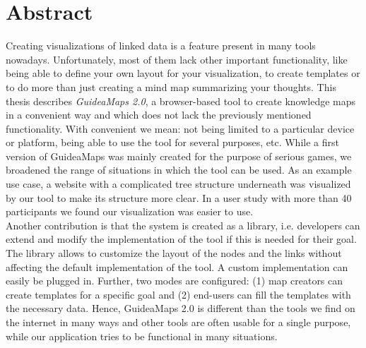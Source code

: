 \section*{Abstract}%

\color{blue}

Creating visualizations of linked data is a feature present in many tools nowadays. Unfortunately, most of them lack other important functionality, like being able to define your own layout for your visualization, to create templates or to do more than just creating a mind map summarizing your thoughts. This thesis describes \textit{GuideaMaps 2.0}, a browser-based tool to create knowledge maps in a convenient way and which does not lack the previously mentioned functionality. With convenient we mean: not being limited to a particular device or platform, being able to use the tool for several purposes, etc. While a first version of GuideaMaps was mainly created for the purpose of serious games, we broadened the range of situations in which the tool can be used. As an example use case, a website with a complicated tree structure underneath was visualized by our tool to make its structure more clear. In a user study with more than 40 participants we found our visualization was easier to use.\\

Another contribution is that the system is created as a library, i.e. developers can extend and modify the implementation of the tool if this is needed for their goal. The library allows to customize the layout of the nodes and the links without affecting the default implementation of the tool. A custom implementation can easily be plugged in. Further, two modes are configured: (1) map creators can create templates for a specific goal and (2) end-users can fill the templates with the necessary data. Hence, GuideaMaps 2.0 is different than the tools we find on the internet in many ways and other tools are often usable for a single purpose, while our application tries to be functional in many situations.

\color{black}